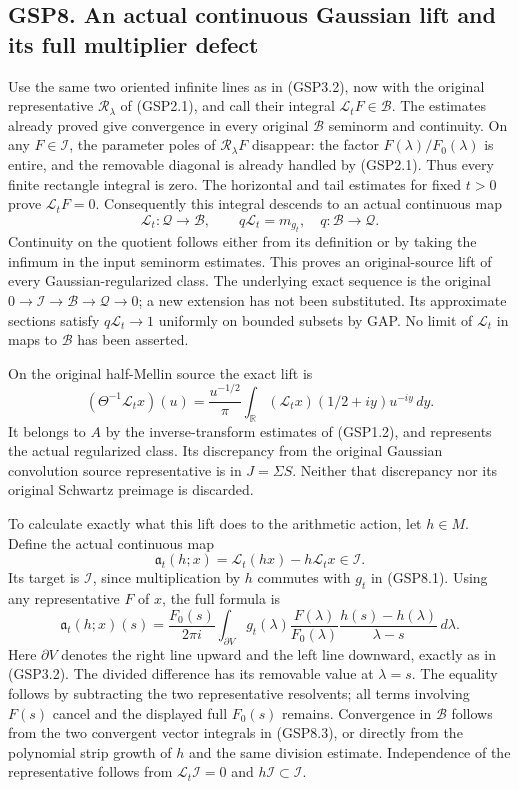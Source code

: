 \subsection{GSP8. An actual continuous Gaussian lift and its full
multiplier
defect}\label{gsp8.-an-actual-continuous-gaussian-lift-and-its-full-multiplier-defect}

Use the same two oriented infinite lines as in (GSP3.2), now with the
original representative \(\mathscr R_\lambda\) of (GSP2.1), and call
their integral \(\mathscr L_tF\in\mathcal B\). The estimates already
proved give convergence in every original \(\mathcal B\) seminorm and
continuity. On any \(F\in\mathcal I\), the parameter poles of
\(\mathscr R_\lambda F\) disappear: the factor
\(F(\lambda)/F_0(\lambda)\) is entire, and the removable diagonal is
already handled by (GSP2.1). Thus every finite rectangle integral is
zero. The horizontal and tail estimates for fixed \(t>0\) prove
\(\mathscr L_tF=0\). Consequently this integral descends to an actual
continuous map \[
\mathcal L_t:\mathcal Q\longrightarrow\mathcal B,\qquad
q\mathcal L_t=m_{g_t},\quad q:\mathcal B\to\mathcal Q.
\tag{GSP8.1}
\] Continuity on the quotient follows either from its definition or by
taking the infimum in the input seminorm estimates. This proves an
original-source lift of every Gaussian-regularized class. The underlying
exact sequence is the original
\(0\to\mathcal I\to\mathcal B\to\mathcal Q\to0\); a new extension has
not been substituted. Its approximate sections satisfy
\(q\mathcal L_t\to1\) uniformly on bounded subsets by GAP. No limit of
\(\mathcal L_t\) in maps to \(\mathcal B\) has been asserted.

On the original half-Mellin source the exact lift is \[
(\Theta^{-1}\mathcal L_tx)(u)=\frac{u^{-1/2}}\pi
\int_{\mathbb R}(\mathcal L_tx)(1/2+iy)u^{-iy}\,dy.
\tag{GSP8.2}
\] It belongs to \(A\) by the inverse-transform estimates of (GSP1.2),
and represents the actual regularized class. Its discrepancy from the
original Gaussian convolution source representative is in
\(J=\Sigma S\). Neither that discrepancy nor its original Schwartz
preimage is discarded.

To calculate exactly what this lift does to the arithmetic action, let
\(h\in M\). Define the actual continuous map \[
\mathfrak a_t(h;x)=\mathcal L_t(hx)-h\mathcal L_tx\in\mathcal I.
\tag{GSP8.3}
\] Its target is \(\mathcal I\), since multiplication by \(h\) commutes
with \(g_t\) in (GSP8.1). Using any representative \(F\) of \(x\), the
full formula is \[
\mathfrak a_t(h;x)(s)=\frac{F_0(s)}{2\pi i}
\int_{\partial V}g_t(\lambda)\frac{F(\lambda)}{F_0(\lambda)}
\frac{h(s)-h(\lambda)}{\lambda-s}\,d\lambda.
\tag{GSP8.4}
\] Here \(\partial V\) denotes the right line upward and the left line
downward, exactly as in (GSP3.2). The divided difference has its
removable value at \(\lambda=s\). The equality follows by subtracting
the two representative resolvents; all terms involving \(F(s)\) cancel
and the displayed full \(F_0(s)\) remains. Convergence in \(\mathcal B\)
follows from the two convergent vector integrals in (GSP8.3), or
directly from the polynomial strip growth of \(h\) and the same division
estimate. Independence of the representative follows from
\(\mathscr L_t\mathcal I=0\) and \(h\mathcal I\subset\mathcal I\).

